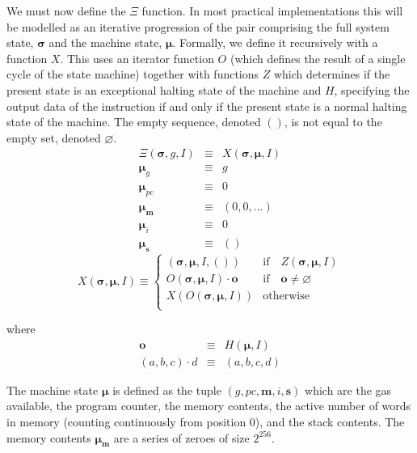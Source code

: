 \documentclass[9pt,oneside]{amsart}
\begin{document}
\begin{multicols}{2}
We must now define the $\Xi$ function. In most practical implementations this will be modelled as an iterative progression of the pair comprising the full system state, $\boldsymbol{\sigma}$ and the machine state, $\boldsymbol{\mu}$. Formally, we define it recursively with a function $X$. This uses an iterator function $O$ (which defines the result of a single cycle of the state machine) together with functions $Z$ which determines if the present state is an exceptional halting state of the machine and $H$, specifying the output data of the instruction if and only if the present state is a normal halting state of the machine. The empty sequence, denoted $()$, is not equal to the empty set, denoted $\varnothing$.
\begin{eqnarray}
\Xi(\boldsymbol{\sigma}, g, I) & \equiv & X(\boldsymbol{\sigma}, \boldsymbol{\mu}, I) \\
\boldsymbol{\mu}_g & \equiv & g \\
\boldsymbol{\mu}_{pc} & \equiv & 0 \\
\boldsymbol{\mu}_\mathbf{m} & \equiv & (0, 0, ...) \\
\boldsymbol{\mu}_i & \equiv & 0 \\
\boldsymbol{\mu}_\mathbf{s} & \equiv & ()
\end{eqnarray}
\begin{equation}
X(\boldsymbol{\sigma}, \boldsymbol{\mu}, I) \equiv \begin{cases}
(\boldsymbol{\sigma}, \boldsymbol{\mu}, I, ()) & \text{if} \quad Z(\boldsymbol{\sigma}, \boldsymbol{\mu}, I)\\
O(\boldsymbol{\sigma}, \boldsymbol{\mu}, I) \cdot \mathbf{o} & \text{if} \quad \mathbf{o} \neq \varnothing\\
X(O(\boldsymbol{\sigma}, \boldsymbol{\mu}, I)) & \text{otherwise}\\
\end{cases}
\end{equation}

where
\begin{eqnarray}
\mathbf{o} & \equiv & H(\boldsymbol{\mu}, I) \\
(a, b, c) \cdot d & \equiv & (a, b, c, d)
\end{eqnarray}

The machine state $\boldsymbol{\mu}$ is defined as the tuple $(g, pc, \mathbf{m}, i, \mathbf{s})$ which are the gas available, the program counter, the memory contents, the active number of words in memory (counting continuously from position 0), and the stack contents. The memory contents $\boldsymbol{\mu}_\mathbf{m}$ are a series of zeroes of size $2^{256}$.


\end{multicols}
\end{document}
